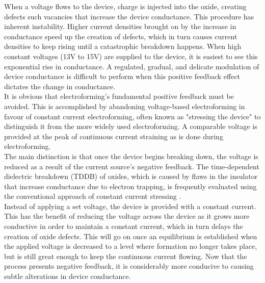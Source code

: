 \noindent When a voltage flows to the device, charge is injected into the oxide, creating defects such vacancies that increase the device conductance. This procedure has inherent instability. Higher current densities brought on by the increase in conductance speed up the creation of defects, which in turn causes current densities to keep rising until a catastrophic breakdown happens. When high constant voltages (13V to 15V) are supplied to the device, it is easiest to see this exponential rise in conductance. A regulated, gradual, and delicate modulation of device conductance is difficult to perform when this positive feedback effect dictates the change in conductance.\\

\noindent It is obvious that electroforming's fundamental positive feedback must be avoided. This is accomplished by abandoning voltage-based electroforming in favour of constant current electroforming, often known as "stressing the device" to distinguish it from the more widely used electroforming. A comparable voltage is provided at the peak of continuous current straining as is done during electroforming. \\

\noindent The main distinction is that once the device begins breaking down, the voltage is reduced as a result of the current source's negative feedback. The time-dependent dielectric breakdown (TDDB) of oxides, which is caused by flaws in the insulator that increase conductance due to electron trapping, is frequently evaluated using the conventional approach of constant current stressing \cite{1487102}. \\

\noindent Instead of applying a set voltage, the device is provided with a constant current. This has the benefit of reducing the voltage across the device as it grows more conductive in order to maintain a constant current, which in turn delays the creation of oxide defects. This will go on once an equilibrium is established when the applied voltage is decreased to a level where formation no longer takes place, but is still great enough to keep the continuous current flowing. Now that the process presents negative feedback, it is considerably more conducive to causing subtle alterations in device conductance. \\



